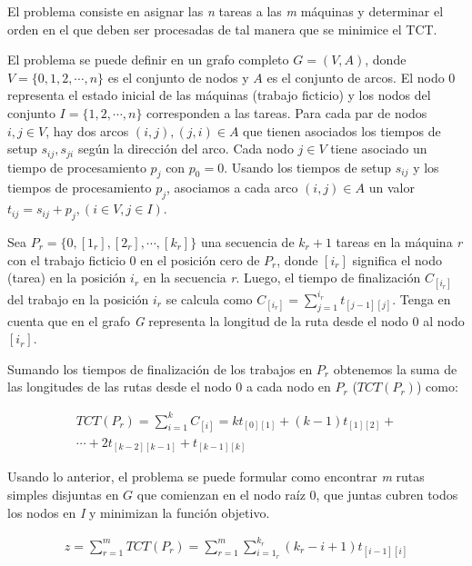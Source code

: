 El problema consiste en asignar las \textit{n} tareas a las \textit{m} m\'aquinas y determinar el orden en el que deben ser procesadas de tal manera que se minimice el TCT.

El problema se puede definir en un grafo completo $G = (V,A)$, donde \linebreak $V = \{0,1,2, \cdots, n\}$ es el conjunto de nodos y $A$ es el conjunto de arcos. El nodo $0$ representa el estado inicial de las m\'aquinas (trabajo ficticio) y los nodos del conjunto $I = \{1,2, \cdots, n\}$ corresponden a las tareas. Para cada par de nodos $i, j \in V$, hay dos arcos $(i, j), (j, i) \in A$ que tienen asociados los tiempos de setup $s_{ij}, s_{ji}$ seg\'un la direcci\'on del arco. Cada nodo $j \in V$ tiene asociado un tiempo de procesamiento $p_j$ con $p_0 = 0 $. Usando los tiempos de setup $s_{ij}$ y los tiempos de procesamiento $p_j$, asociamos a cada arco $(i, j) \in A$ un valor $t_{ij} = s_{ij} + p_j, (i \in V, j \in I)$.

Sea $P_r = \{0, [1_r], [2_r], \cdots, [k_r] \}$ una secuencia de $k_r + 1$ tareas en la m\'aquina \textit{r} con el trabajo ficticio $0$ en el posici\'on cero de $P_r$, donde $[i_r]$ significa el nodo (tarea) en la posici\'on $i_r$ en la secuencia \textit{r}. Luego, el tiempo de finalizaci\'on $C_{[i_r]}$ del trabajo en la posici\'on $i_r$ se calcula como $C_{[i_r]} = \sum_ {j = 1} ^ {i_r} t _ {[j-1 ] [j]} $. Tenga en cuenta que en el grafo \textit{G} representa la longitud de la ruta desde el nodo $0$ al nodo $[i_r]$.

Sumando los tiempos de finalizaci\'on de los trabajos en $P_r$ obtenemos la suma de las longitudes de las rutas desde el nodo 0 a cada nodo en $P_r$ ($TCT(P_r)$) como:

\begin{align}
\label{form1}TCT(P_r) = \sum_{i=1}^k C_{[i]} =  
kt_{[0][1]} + (k-1) t_{[1][2]} + \nonumber \\ \cdots + 2t_{[k-2][k-1]} + t_{[k-1][k]}
\end{align}

Usando lo anterior, el problema se puede formular como encontrar \textit{m} rutas simples disjuntas en $G$ que comienzan en el nodo ra\'iz 0, que juntas cubren todos los nodos en \textit{I} y minimizan la funci\'on objetivo.

\begin{align}
\label{form2}z= \sum_{r=1}^{m} TCT(P_r ) =  \sum_{r=1}^{m}\sum_{i=1_{r}}^{k_{r}}(k_{r}-i+1)t_{[i-1][i]}
\end{align}

